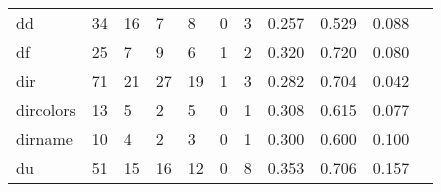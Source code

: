 \begin{longtable}{lp{1.2cm}p{1.2cm}p{1.2cm}p{1.2cm}p{1.2cm}p{1.2cm}p{1.2cm}p{1.2cm}p{1.2cm}p{1.2cm}}
dd        &                                    34 &                                                 16 &                                                  7 &                                                  8 &                                                  0 &                                                  3 &                                         0.257 &                                              0.529 &                                              0.088 \\
df        &                                    25 &                                                  7 &                                                  9 &                                                  6 &                                                  1 &                                                  2 &                                         0.320 &                                              0.720 &                                              0.080 \\
dir       &                                    71 &                                                 21 &                                                 27 &                                                 19 &                                                  1 &                                                  3 &                                         0.282 &                                              0.704 &                                              0.042 \\
dircolors &                                    13 &                                                  5 &                                                  2 &                                                  5 &                                                  0 &                                                  1 &                                         0.308 &                                              0.615 &                                              0.077 \\
dirname   &                                    10 &                                                  4 &                                                  2 &                                                  3 &                                                  0 &                                                  1 &                                         0.300 &                                              0.600 &                                              0.100 \\
du        &                                    51 &                                                 15 &                                                 16 &                                                 12 &                                                  0 &                                                  8 &                                         0.353 &                                              0.706 &                                              0.157 \\

\end{longtable}
